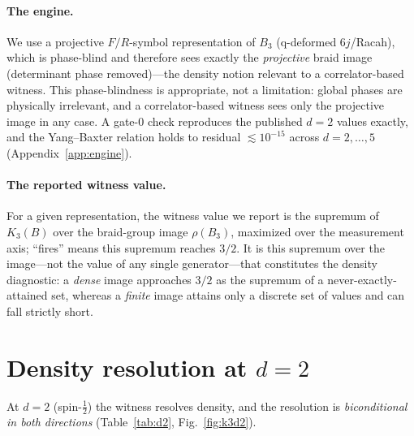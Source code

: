 \documentclass[aps,prx,reprint,amsmath,amssymb,floatfix,nofootinbib,superscriptaddress]{revtex4-2}
\begin{document}
\paragraph{The engine.}
We use a projective $F/R$-symbol representation of $B_3$ (q-deformed $6j$/Racah),
which is phase-blind and therefore sees exactly the \emph{projective} braid image
(determinant phase removed)---the density notion relevant to a correlator-based
witness. This phase-blindness is appropriate, not a limitation: global phases are
physically irrelevant, and a correlator-based witness sees only the projective image
in any case. A gate-$0$ check reproduces the published $d=2$ values exactly, and the
Yang--Baxter relation holds to residual $\lesssim 10^{-15}$ across $d = 2,\ldots,5$
(Appendix~\ref{app:engine}).

\paragraph{The reported witness value.}
For a given representation, the witness value we report is the
supremum of $K_3(B)$ over the braid-group image $\rho(B_3)$,
maximized over the measurement axis; ``fires'' means this supremum
reaches $3/2$. It is this supremum over the image---not the value of
any single generator---that constitutes the density diagnostic: a
\emph{dense} image approaches $3/2$ as the supremum of a
never-exactly-attained set, whereas a \emph{finite} image attains
only a discrete set of values and can fall strictly short.

\section{Density resolution at $d=2$}
\label{sec:d2}

At $d=2$ (spin-$\tfrac12$) the witness resolves density, and the resolution is
\emph{biconditional in both directions} (Table~\ref{tab:d2}, Fig.~\ref{fig:k3d2}).
\end{document}
